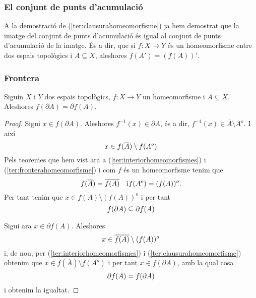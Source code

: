 \documentclass[../main.tex]{subfiles}
\begin{document}
\subsubsection{El conjunt de punts d'acumulació}
A la demostració de (\ref{ter:clausurahomeomorfisme}) ja hem demostrat que la imatge del conjunt de punts d'acumulació és igual al conjunt de punts d'acumulació de la imatge. És a dir, que si $f:X\rightarrow Y$ és un homeomorfisme entre dos espais topològics i $A\subseteq X$, aleshores $f(A') = (f(A))'$.

\subsubsection{Frontera}

\begin{ter}
\label{ter:fronterahomeomorfisme} Siguin $X$ i $Y$ dos espais topològics, $f:X\rightarrow Y$ un homeomorfisme i $A\subseteq X$. Aleshores $f(\partial A) = \partial f(A)$.
\end{ter}
\begin{proof}
Sigui $x\in f(\partial A)$. Aleshores $f^{-1}(x)\in\partial A$, és a dir, $f^{-1}(x)\in \overline{A}\setminus A^{o}$. I així
\begin{equation}
    \notag
    x\in f(\overline{A})\setminus f(A^{o})
\end{equation}
Pels teoremes que hem vist ara a (\ref{ter:interiorhomeomorfismes}) i (\ref{ter:fronterahomeomorfisme}) i com $f$ és un homeomorfisme tenim que
\begin{equation}
    \notag
    f(\overline{A}) = \overline{f(A)} \quad \text{i} f(A^{o}) = (f(A))^{o}.
\end{equation}
Per tant tenim que $x\in \overline{f(A)}\setminus (f(A))^{o}$ i per tant
\begin{equation}
    \notag
    f(\partial A)\subseteq\partial f(A)
\end{equation}

Sigui ara $x\in \partial f(A)$. Aleshores
\begin{equation}
    \notag
    x\in \overline{f(A)}\setminus (f(A))^{o}
\end{equation}
i, de nou, per (\ref{ter:interiorhomeomorfismes}) i (\ref{ter:clausurahomeomorfisme}) obtenim que $x\in f(\overline{A})\setminus f(A^{o})$ i per tant $x\in f(\partial A)$, amb la qual cosa
\begin{equation}
    \notag
    \partial f(A) = f(\partial A)
\end{equation}
i obtenim la igualtat.
\end{proof}
\end{document}
